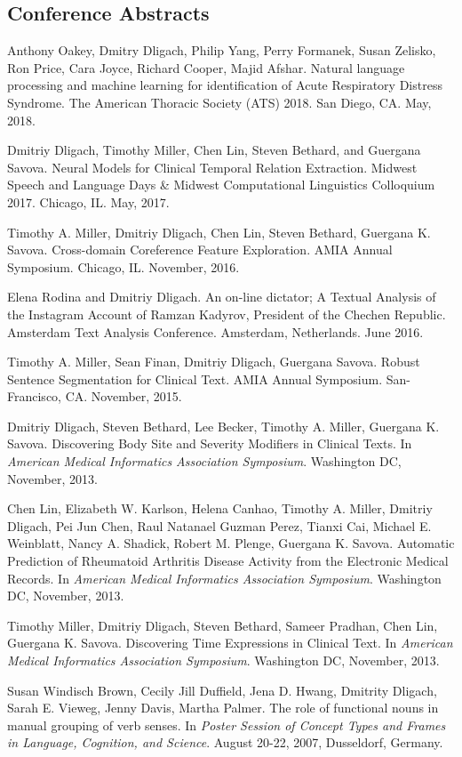 \documentclass[letterpaper]{article}
\renewenvironment{itemize}{
  \begin{list}{}{
    \setlength{\leftmargin}{1.5em}
  }
}{
  \end{list}
}
\begin{document}
\subsection*{Conference Abstracts}
\begin{itemize}
\item Anthony Oakey, Dmitry Dligach, Philip Yang, Perry Formanek, Susan Zelisko, Ron Price, Cara Joyce, Richard Cooper, Majid Afshar. Natural language processing and machine learning for identification of Acute Respiratory Distress Syndrome. The American Thoracic Society (ATS) 2018. San Diego, CA. May, 2018.
\item Dmitriy Dligach, Timothy Miller, Chen Lin, Steven Bethard, and Guergana Savova. Neural Models for Clinical Temporal Relation Extraction. Midwest Speech and Language Days \& Midwest Computational Linguistics Colloquium 2017. Chicago, IL. May, 2017.
\item Timothy A. Miller, Dmitriy Dligach, Chen Lin, Steven Bethard, Guergana K. Savova. Cross-domain Coreference Feature Exploration. AMIA Annual Symposium. Chicago, IL. November, 2016.
\item Elena Rodina and Dmitriy Dligach. An on-line dictator; A Textual Analysis of the Instagram Account of Ramzan Kadyrov, President of the Chechen Republic. Amsterdam Text Analysis Conference. Amsterdam, Netherlands. June 2016.
\item Timothy A. Miller, Sean Finan, Dmitriy Dligach, Guergana Savova. Robust Sentence Segmentation for Clinical Text. AMIA Annual Symposium. San-Francisco, CA. November, 2015.
\item Dmitriy Dligach, Steven Bethard, Lee Becker, Timothy A. Miller, Guergana K. Savova. Discovering Body Site and Severity Modifiers in Clinical Texts. In \emph{American Medical Informatics Association Symposium}. Washington DC, November, 2013.
\item Chen Lin, Elizabeth W. Karlson, Helena Canhao, Timothy A. Miller, Dmitriy Dligach, Pei Jun Chen, Raul Natanael Guzman Perez, Tianxi Cai, Michael E. Weinblatt, Nancy A. Shadick, Robert M. Plenge, Guergana K. Savova. Automatic Prediction of Rheumatoid Arthritis Disease Activity from the Electronic Medical Records. In \emph{American Medical Informatics Association Symposium}. Washington DC, November, 2013.
\item Timothy Miller, Dmitriy Dligach, Steven Bethard, Sameer Pradhan, Chen Lin, Guergana K. Savova. Discovering Time Expressions in Clinical Text. In \emph{American Medical Informatics Association Symposium}. Washington DC, November, 2013.
\item Susan Windisch Brown, Cecily Jill Duffield, Jena D. Hwang, Dmitrity Dligach, Sarah E. Vieweg, Jenny Davis, Martha Palmer. The role of functional nouns in manual grouping of verb senses. In \emph {Poster Session of Concept Types and Frames in Language, Cognition, and Science}. August 20-22, 2007, Dusseldorf, Germany.
\end{itemize}
\end{document}
